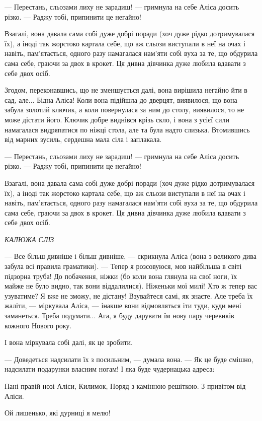 — Перестань, сльозами лиху не зарадиш! — гримнула на себе Аліса досить різко. —
Раджу тобі, припинити це негайно!

Взагалі, вона давала сама собі дуже добрі поради (хоч дуже рідко дотримувалася
їх), а іноді так жорстоко картала себе, що аж сльози виступали в неї на очах і
навіть, пам'ятається, одного разу намагалася нам'яти собі вуха за те, що
обдурила сама себе, граючи за двох в крокет. Ця дивна дівчинка дуже любила
вдавати з себе двох осіб.

Згодом, переконавшись, що не зменшується далі, вона вирішила негайно йти в сад,
але... Бідна Аліса! Коли вона підійшла до дверцят, виявилося, що вона забула
золотий ключик, а коли повернулася за ним до столу, виявилося, то не може
дістати його. Ключик добре виднівся крізь скло, і вона з усієї сили намагалася
видряпатися по ніжці стола, але та була надто слизька. Втомившись від марних
зусиль, сердешна мала сіла і заплакала.

— Перестань, сльозами лиху не зарадиш! — гримнула на себе Аліса досить різко. —
Раджу тобі, припинити це негайно!

Взагалі, вона давала сама собі дуже добрі поради (хоч дуже рідко дотримувалася
їх), а іноді так жорстоко картала себе, що аж сльози виступали в неї на очах і
навіть, пам’ятається, одного разу намагалася нам’яти собі вуха за те, що
обдурила сама себе, граючи за двох в крокет. Ця дивна дівчинка дуже любила
вдавати з себе двох осіб.

\emph{КАЛЮЖА СЛІЗ}

— Все більш дивніше і більш дивніше, — скрикнула Аліса (вона з великого дива
забула всі правила граматики). — Тепер я розсовуюся, мов найбільша в світі
підзорна труба! До побачення, ніжки (бо коли вона глянула на свої ноги, їх
майже не було видно, так вони віддалилися). Ніженьки мої милі! Хто ж тепер вас
узуватиме? Я вже не зможу, не дістану! Взувайтеся самі, як знаєте. Але треба їх
жаліти, — міркувала Аліса, — інакше вони відмовляться іти туди, куди мені
заманеться. Треба подумати... Ага, я буду дарувати їм нову пару черевиків
кожного Нового року.

І вона міркувала собі далі, як це зробити.

— Доведеться надсилати їх з посильним, — думала вона. — Як це буде смішно,
надсилати подарунки власним ногам! І яка буде чудернацька адреса:

Пані правій нозі Аліси, Килимок, Поряд з камінною решіткою.  З привітом від
Аліси.

Ой лишенько, які дурниці я мелю!

